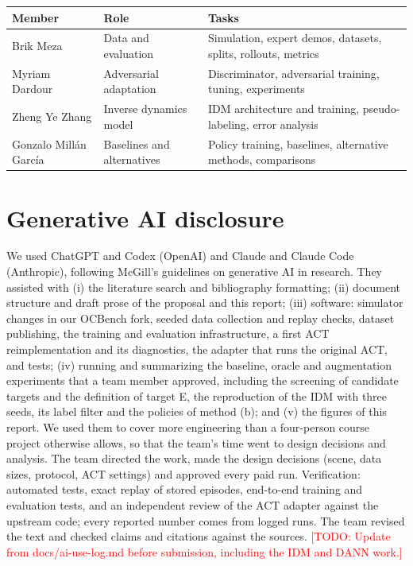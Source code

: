 \documentclass{article}
\newcommand{\todo}[1]{\textcolor{red}{[TODO: #1]}}
\begin{document}
\begin{center}
\small
\begin{tabular}{@{}>{\raggedright\arraybackslash}p{2.6cm}>{\raggedright\arraybackslash}p{3.2cm}>{\raggedright\arraybackslash}p{6.7cm}@{}}
\toprule
Member & Role & Tasks \\
\midrule
Brik Meza & Data and evaluation & Simulation, expert demos, datasets, splits, rollouts, metrics \\
Myriam Dardour & Adversarial adaptation & Discriminator, adversarial training, tuning, experiments \\
Zheng Ye Zhang & Inverse dynamics model & IDM architecture and training, pseudo-labeling, error analysis \\
Gonzalo Mill\'an Garc\'ia & Baselines and alternatives & Policy training, baselines, alternative methods, comparisons \\
\bottomrule
\end{tabular}
\end{center}

\section*{Generative AI disclosure}
We used ChatGPT and Codex (OpenAI) and Claude and Claude Code (Anthropic), following
McGill's guidelines on generative AI in research. They assisted with (i) the literature
search and bibliography formatting; (ii) document structure and draft prose of the
proposal and this report; (iii) software: simulator changes in our OCBench fork, seeded
data collection and replay checks, dataset publishing, the training and evaluation
infrastructure, a first ACT reimplementation and its diagnostics, the adapter that runs
the original ACT, and tests; (iv) running and summarizing the baseline, oracle and
augmentation experiments that a team member approved, including the screening of
candidate targets and the definition of target E, the reproduction of the IDM with three
seeds, its label filter and the policies of method (b); and (v) the figures of this report. We used them to cover more engineering than a four-person
course project otherwise allows, so that the team's time went to design decisions and
analysis. The team directed the work, made the design decisions (scene, data sizes,
protocol, ACT settings) and approved every paid run. Verification: automated tests,
exact replay of stored episodes, end-to-end training and evaluation tests, and an
independent review of the ACT adapter against the upstream code; every reported number
comes from logged runs. The team revised the text and checked claims and citations
against the sources. \todo{Update from docs/ai-use-log.md before submission, including
the IDM and DANN work.}



\end{document}
